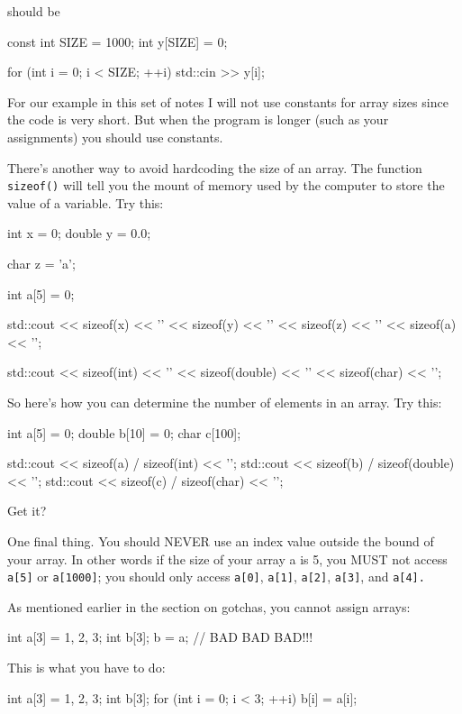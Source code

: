 should be

\begin{consolethree}[escapeinside=||]const int SIZE = 1000;
int y[SIZE] = {0};

for (int i = 0; i < SIZE; ++i)
{
    std::cin >> y[i];
}
\end{consolethree}

For our example in this set of notes I will not use constants for array
sizes since the code is very short. But when the program is longer (such
as your assignments) you should use constants.

There's another way to avoid hardcoding the size of an
array. The function \texttt{sizeof()} will tell you the mount of memory
used by the computer to store the value of a variable. Try this:

\begin{consolethree}[escapeinside=||]int x = 0;
double y = 0.0;

char z = 'a';

int a[5] = {0};

std::cout << sizeof(x) << '\n'
          << sizeof(y) << '\n'
          << sizeof(z) << '\n'
          << sizeof(a) << '\n';

std::cout << sizeof(int) << '\n'
          << sizeof(double) << '\n'
          << sizeof(char) << '\n'; 
\end{consolethree}

So here's how you can determine the number of elements
in an array. Try this:

\begin{consolethree}[escapeinside=||]
int a[5] = {0};
double b[10] = {0};
char c[100];

std::cout << sizeof(a) / sizeof(int) << '\n';
std::cout << sizeof(b) / sizeof(double) << '\n';
std::cout << sizeof(c) / sizeof(char) << '\n'; 
\end{consolethree}

Get it?

One final thing. You should NEVER use an index value outside the bound
of your array. In other words if the size of your array a is 5, you MUST
not access \texttt{a[5]} or \texttt{a[1000]}; you should only access
\texttt{a[0]}, \texttt{a[1]}, \texttt{a[2]}, \texttt{a[3]}, and
\texttt{a[4].}

As mentioned earlier in the section on gotchas, you cannot assign
arrays:
\begin{consolethree}
int a[3] = {1, 2, 3};
int b[3];
b = a;               // BAD BAD BAD!!!
\end{consolethree}
This is what you have to do:
\begin{consolethree}
int a[3] = {1, 2, 3};
int b[3];
for (int i = 0; i < 3; ++i)
{
    b[i] = a[i];
}
\end{consolethree}

\newpage{}

